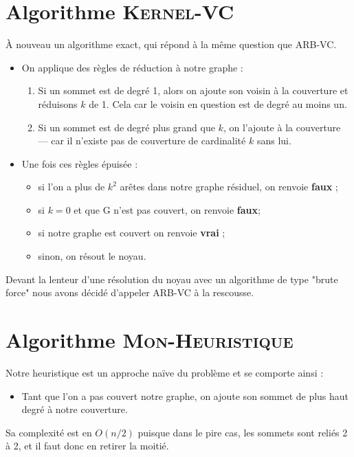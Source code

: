 \documentclass[a4paper,10pt,twoside]{report}
\begin{document}
    \section{Algorithme \textsc{Kernel-VC}}
    À nouveau un algorithme exact, qui répond à la même question que \textsc{ARB-VC}.
    \begin{itemize}
        \item On applique des règles de réduction à notre graphe :
        \begin{enumerate}
            \item Si un sommet est de degré 1, alors on ajoute son voisin à la couverture et réduisons $k$ de 1. Cela car le voisin en question est de degré au moins un.
            \item Si un sommet est de degré plus grand que $k$, on l'ajoute à la couverture --- car il n'existe pas de couverture de cardinalité $k$ sans lui.
        \end{enumerate}
        \item Une fois ces règles épuisée :
        \begin{itemize}
            \item si l'on a plus de $k^2$ arêtes dans notre graphe résiduel, on renvoie \textbf{faux} ;
            \item si $k = 0$ et que G n'est pas couvert, on renvoie \textbf{faux};
            \item si notre graphe est couvert on renvoie \textbf{vrai} ;
            \item sinon, on résout le noyau.
        \end{itemize}
    \end{itemize}
    Devant la lenteur d'une résolution du noyau avec un algorithme de type "brute force" nous avons décidé d'appeler \textsc{ARB-VC} à la rescousse.
    
    \section{Algorithme \textsc{Mon-Heuristique}}
    Notre heuristique est un approche naïve du problème et se comporte ainsi :
    \begin{itemize}
        \item Tant que l'on a pas couvert notre graphe, on ajoute son sommet de plus haut degré à notre couverture.
    \end{itemize}
    Sa complexité est en $O(n/2)$ puisque dans le pire cas, les sommets sont reliés 2 à 2, et il faut donc en retirer la moitié.  
\end{document}
